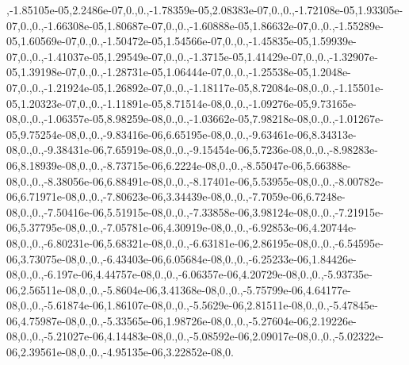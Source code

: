 {,-\/1.\-85105e-\/05,2.\-2486e-\/07,0.,0.,-\/1.\-78359e-\/05,2.\-08383e-\/07,0.,0.,-\/1.\-72108e-\/05,1.\-93305e-\/07,0.,0.,-\/1.\-66308e-\/05,1.\-80687e-\/07,0.,0.,-\/1.\-60888e-\/05,1.\-86632e-\/07,0.,0.,-\/1.\-55289e-\/05,1.\-60569e-\/07,0.,0.,-\/1.\-50472e-\/05,1.\-54566e-\/07,0.,0.,-\/1.\-45835e-\/05,1.\-59939e-\/07,0.,0.,-\/1.\-41037e-\/05,1.\-29549e-\/07,0.,0.,-\/1.\-3715e-\/05,1.\-41429e-\/07,0.,0.,-\/1.\-32907e-\/05,1.\-39198e-\/07,0.,0.,-\/1.\-28731e-\/05,1.\-06444e-\/07,0.,0.,-\/1.\-25538e-\/05,1.\-2048e-\/07,0.,0.,-\/1.\-21924e-\/05,1.\-26892e-\/07,0.,0.,-\/1.\-18117e-\/05,8.\-72084e-\/08,0.,0.,-\/1.\-15501e-\/05,1.\-20323e-\/07,0.,0.,-\/1.\-11891e-\/05,8.\-71514e-\/08,0.,0.,-\/1.\-09276e-\/05,9.\-73165e-\/08,0.,0.,-\/1.\-06357e-\/05,8.\-98259e-\/08,0.,0.,-\/1.\-03662e-\/05,7.\-98218e-\/08,0.,0.,-\/1.\-01267e-\/05,9.\-75254e-\/08,0.,0.,-\/9.\-83416e-\/06,6.\-65195e-\/08,0.,0.,-\/9.\-63461e-\/06,8.\-34313e-\/08,0.,0.,-\/9.\-38431e-\/06,7.\-65919e-\/08,0.,0.,-\/9.\-15454e-\/06,5.\-7236e-\/08,0.,0.,-\/8.\-98283e-\/06,8.\-18939e-\/08,0.,0.,-\/8.\-73715e-\/06,6.\-2224e-\/08,0.,0.,-\/8.\-55047e-\/06,5.\-66388e-\/08,0.,0.,-\/8.\-38056e-\/06,6.\-88491e-\/08,0.,0.,-\/8.\-17401e-\/06,5.\-53955e-\/08,0.,0.,-\/8.\-00782e-\/06,6.\-71971e-\/08,0.,0.,-\/7.\-80623e-\/06,3.\-34439e-\/08,0.,0.,-\/7.\-7059e-\/06,6.\-7248e-\/08,0.,0.,-\/7.\-50416e-\/06,5.\-51915e-\/08,0.,0.,-\/7.\-33858e-\/06,3.\-98124e-\/08,0.,0.,-\/7.\-21915e-\/06,5.\-37795e-\/08,0.,0.,-\/7.\-05781e-\/06,4.\-30919e-\/08,0.,0.,-\/6.\-92853e-\/06,4.\-20744e-\/08,0.,0.,-\/6.\-80231e-\/06,5.\-68321e-\/08,0.,0.,-\/6.\-63181e-\/06,2.\-86195e-\/08,0.,0.,-\/6.\-54595e-\/06,3.\-73075e-\/08,0.,0.,-\/6.\-43403e-\/06,6.\-05684e-\/08,0.,0.,-\/6.\-25233e-\/06,1.\-84426e-\/08,0.,0.,-\/6.\-197e-\/06,4.\-44757e-\/08,0.,0.,-\/6.\-06357e-\/06,4.\-20729e-\/08,0.,0.,-\/5.\-93735e-\/06,2.\-56511e-\/08,0.,0.,-\/5.\-8604e-\/06,3.\-41368e-\/08,0.,0.,-\/5.\-75799e-\/06,4.\-64177e-\/08,0.,0.,-\/5.\-61874e-\/06,1.\-86107e-\/08,0.,0.,-\/5.\-5629e-\/06,2.\-81511e-\/08,0.,0.,-\/5.\-47845e-\/06,4.\-75987e-\/08,0.,0.,-\/5.\-33565e-\/06,1.\-98726e-\/08,0.,0.,-\/5.\-27604e-\/06,2.\-19226e-\/08,0.,0.,-\/5.\-21027e-\/06,4.\-14483e-\/08,0.,0.,-\/5.\-08592e-\/06,2.\-09017e-\/08,0.,0.,-\/5.\-02322e-\/06,2.\-39561e-\/08,0.,0.,-\/4.\-95135e-\/06,3.\-22852e-\/08,0.\-}
